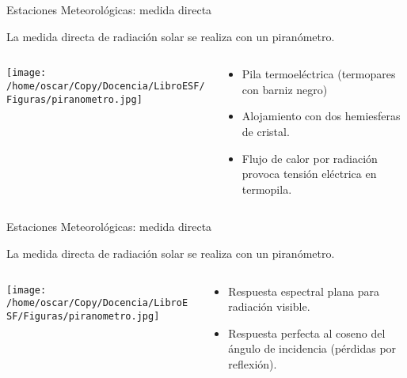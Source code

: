 \documentclass[xcolor={usenames,svgnames,dvipsnames}]{beamer}
\begin{document}
\begin{frame}[label=sec-2-1]{Estaciones Meteorológicas: medida directa}
\begin{block}{La medida directa de radiación solar se realiza con un piranómetro.}
\end{block}
\begin{columns}
\begin{column}{0.4\textwidth}
\begin{center}
\texttt{[image: /home/oscar/Copy/Docencia/LibroESF/Figuras/piranometro.jpg]}
\end{center}
\end{column}

\begin{column}{0.6\textwidth}
\begin{itemize}
\item Pila termoeléctrica (termopares con barniz negro)
\item Alojamiento con dos hemiesferas de cristal.
\item Flujo de calor por radiación provoca tensión eléctrica en termopila.
\end{itemize}
\end{column}
\end{columns}
\end{frame}
\begin{frame}[label=sec-2-2]{Estaciones Meteorológicas: medida directa}
\begin{block}{La medida directa de radiación solar se realiza con un piranómetro.}
\end{block}
\begin{columns}
\begin{column}{0.4\textwidth}
\begin{center}
\texttt{[image: /home/oscar/Copy/Docencia/LibroESF/Figuras/piranometro.jpg]}
\end{center}
\end{column}

\begin{column}{0.6\textwidth}
\begin{itemize}
\item Respuesta espectral plana para radiación visible.
\item Respuesta perfecta al coseno del ángulo de incidencia (pérdidas por reflexión).
\end{itemize}
\end{column}
\end{columns}
\end{frame}
\end{document}
